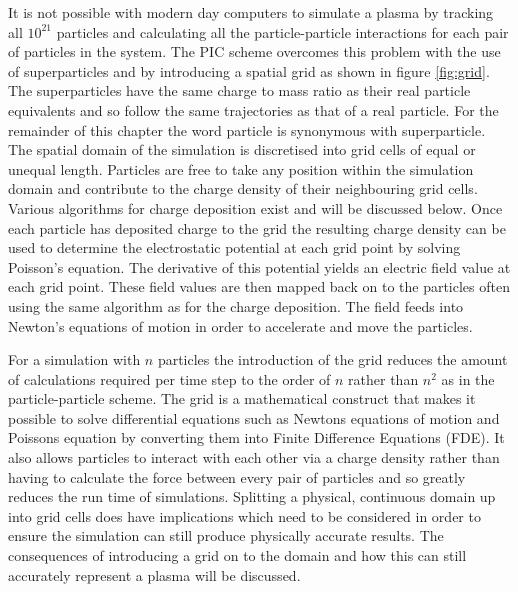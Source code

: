  
 
It is not possible with modern day computers to simulate a plasma by tracking all $10^{21}$ particles and calculating all the particle-particle interactions for each pair of particles in the system. The PIC scheme overcomes this problem with the use of superparticles and by introducing a spatial grid as shown in figure \ref{fig:grid}. The superparticles have the same charge to mass ratio as their real particle equivalents and so follow the same trajectories as that of a real particle. For the remainder of this chapter the word particle is synonymous with superparticle. The spatial domain of the simulation is discretised into grid cells of equal or unequal length. Particles are free to take any position within the simulation domain and contribute to the charge density of their neighbouring grid cells. Various algorithms for charge deposition exist and will be discussed below. Once each particle has deposited charge to the grid the resulting charge density can be used to determine the electrostatic potential at each grid point by solving Poisson's equation. The derivative of this potential yields an electric field value at each grid point. These field values are then mapped back on to the particles often using the same algorithm as for the charge deposition. The field feeds into Newton's equations of motion in order to accelerate and move the particles. 


For a simulation with $n$ particles the introduction of the grid reduces the amount of calculations required per time step to the order of $n$ rather than $n^2$ as in the particle-particle scheme. The grid is a mathematical construct that makes it possible to solve differential equations such as Newtons equations of motion and Poissons equation by converting them into Finite Difference Equations (FDE). It also allows particles to interact with each other via a charge density rather than having to calculate the force between every pair of particles and so greatly reduces the run time of simulations. Splitting a physical, continuous domain  up into grid cells does have implications which need to be considered in order to ensure the simulation can still produce physically accurate results. The consequences of introducing a grid on to the domain and how this can still accurately represent a plasma will be discussed.

